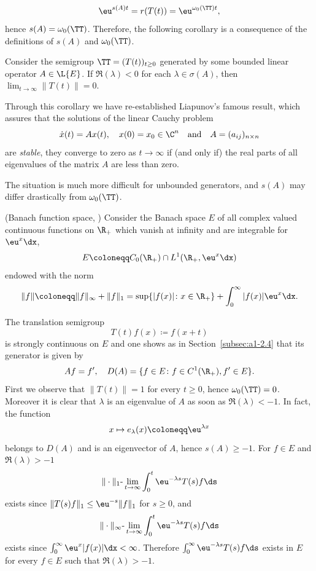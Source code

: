 \[
    \eu^{s(A)t} = r(T(t)) = \eu^{\omega_{0}(\TT) t} ,
\]
hence $s(A) = \omega_{0}(\TT)$.
Therefore, the following corollary is a consequence of the definitions of\/ $s(A)$ and $\omega_{0}(\TT)$.
\begin{corollary}\label{cor:a3-1.2}
Consider the semigroup $\TT = (T(t))_{t \geq 0}$ generated by some bounded linear operator $A \in \L{E}$.
If\/ $\Re(\lambda) < 0$ for each $\lambda \in \sigma(A)$, then 
\mbox{$\lim_{t \to \infty}\|T(t)\| = 0$.}
\end{corollary}
Through this corollary we have re-established Liapunov's  famous result, which assures that the solutions of the linear Cauchy problem
\[
    \dot{x}(t) = Ax(t), \quad x(0) = x_{0} \in \C^{n} \quad \text{and} \quad A = (a_{ij})_{n\times n}
\]
are \emph{stable}, \ie they converge to zero as $t \to \infty$ if (and only if) the real parts of all eigenvalues of the matrix $A$ are less than zero.

The situation is much more difficult for unbounded generators, and $s(A)$ may differ drastically from $\omega_{0}(\TT)$.
\begin{example}\label{ex:a3-1.3}(Banach function space, \textcite{greinervoigtwolff:1981})
Consider the Banach space $E$ of all complex valued continuous functions on $\R_{+}$ which vanish at infinity and are integrable for $\eu^{x}\dx$, \ie 
\[
    E \coloneqq C_{0}(\R_{+}) \cap L^{1}(\R_{+}, \eu^{x}\dx)
\]
endowed with the norm
\[
    \|f\| \coloneqq \|f\|_{\infty} + \|f\|_{1} = \sup\{|f(x)| \colon x \in \R_{+}\} + \int_{0}^{\infty} |f(x)|\eu^{x} \dx .
\]
\end{example}
The translation semigroup
\[
    T(t)f(x) \coloneqq f(x+t)
\]
is strongly continuous on $E$ and one shows as in Section~\ref{subsec:a1-2.4} that its generator is given by
\[
    Af = f', \quad D(A) = \{ f \in E \colon f \in C^{1}(\R_{+}), f' \in E \} .
\]
First we observe that $\|T(t)\| = 1$ for every $t \geq 0$, hence $\omega_{0}(\TT) = 0$.
Moreover it is clear that $\lambda$ is an eigenvalue of\/ $A$ as soon as $\Re(\lambda) < -1$. In fact, the function
\[
    x \mapsto e_{\lambda}(x) \coloneqq \eu^{\lambda x}
\]
belongs to $D(A)$ and is an eigenvector of\/ $A$, hence $s(A) \geq -1$.
For $f \in E$ and $\Re(\lambda) > -1$ 
\[
    \|\cdot\|_{1}\text{-}\lim_{t \to \infty} \int_{0}^{t} \eu^{-\lambda s}T(s)f \ds
\]
exists since $\|T(s)f\|_{1} \leq \eu^{-s}\|f\|_{1}$ for $s \geq 0$, and
\[
    \|\cdot\|_{\infty}\text{-}\lim_{t \to \infty} \int_{0}^{t} \eu^{-\lambda s}T(s)f \ds
\]
exists since $\int_{0}^{\infty} \eu^{x}|f(x)| \dx < \infty$.
Therefore $\int_{0}^{\infty} \eu^{-\lambda s}T(s)f \ds$ exists in $E$ for every $f \in E$ such that $\Re(\lambda) > -1$.

